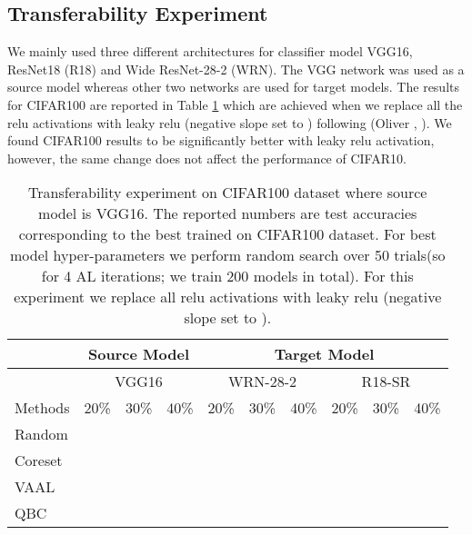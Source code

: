 \documentclass[10pt,twocolumn,letterpaper]{article}
\begin{document}
\subsection{Transferability Experiment}
We mainly used three different architectures for classifier model \ie VGG16, ResNet18 (R18) and Wide ResNet-28-2 (WRN)\footnotemark{\value{0}}. 
The VGG network was used as a source model whereas other two networks are used for target models. The results for CIFAR100 are reported in Table \ref{tab:cifar100_transfer_experiments} which are achieved when we replace all the relu activations with leaky relu (negative slope set to ) following (Oliver \etal, ). We found CIFAR100 results to be significantly better with leaky relu activation, however, the same change does not affect the performance of CIFAR10.

\begin{table}[ht]
\begin{center}
\begin{tabular}{l|c c c|c c c|c c c}

\toprule
        & \multicolumn{3}{c}{Source Model} & \multicolumn{6}{c}{Target Model}\\
        \midrule
& \multicolumn{3}{c|}{VGG16}  & \multicolumn{3}{c|}{WRN-28-2} & \multicolumn{3}{c}{R18-SR} \\
Methods   & 20\%   & 30\%   & 40\%    & 20\%      & 30\%      & 40\%      & 20\%        & 30\%       & 40\% \\
 \midrule
Random  &    &    &     &       &       &      &   &       &   \\
Coreset  &    &    &     &      &      &       &        &       &   \\
VAAL  &    &    &     &       &       &       &          &       &    \\
QBC  &    &    &     &       &       &       &          &       &    \\

\bottomrule
\end{tabular}
\end{center}

\caption{Transferability experiment on CIFAR100 dataset where source model is VGG16. The reported numbers are test accuracies corresponding to the best trained on CIFAR100 dataset. For best model hyper-parameters we perform random search over 50 trials(so for 4 AL iterations; we train 200 models in total). For this experiment we replace all relu activations with leaky relu (negative slope set to ). 
}
\label{tab:cifar100_transfer_experiments}
\end{table}
\end{document}
